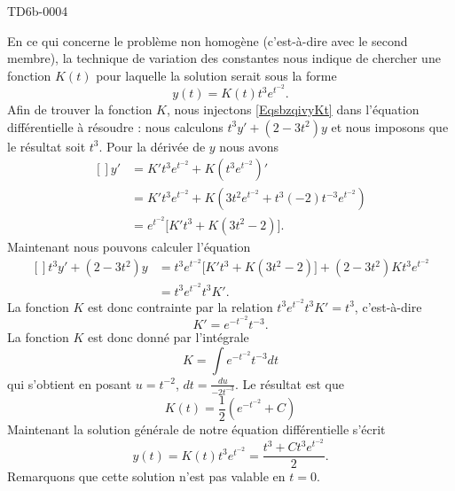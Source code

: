 \begin{corrige}{TD6b-0004}
\begin{enumerate}
			En ce qui concerne le problème non homogène (c'est-à-dire avec le second membre), la technique de variation des constantes nous indique de chercher une fonction $K(t)$ pour laquelle la solution serait sous la forme
			\begin{equation}		\label{EqsbzqivyKt}
				y(t)=K(t)t^3 e^{t^{-2}}.
			\end{equation}
			Afin de trouver la fonction $K$, nous injectons \eqref{EqsbzqivyKt} dans l'équation différentielle à résoudre : nous calculons $t^3y'+(2-3t^2)y$ et nous imposons que le résultat soit $t^3$. Pour la dérivée de $y$ nous avons
			\begin{equation}
				\begin{aligned}[]
					y'&=K't^3 e^{t^{-2}}+K\left( t^3 e^{t^{-2}} \right)'\\
					&=K't^3 e^{t^{-2}}+K\left( 3t^2e^{t^{-2}}+t^3(-2)t^{-3}e^{t^{-2}} \right)\\
					&=e^{t^{-2}}\big[ K't^3+K(3t^2-2) \big].
				\end{aligned}
			\end{equation}
			Maintenant nous pouvons calculer l'équation
			\begin{equation}
				\begin{aligned}[]
					t^3y'+(2-3t^2)y&=t^3e^{t^{-2}}\big[ K't^3+K(3t^2-2) \big]+(2-3t^2)Kt^3e^{t^{-2}}\\
					&=t^3e^{t^{-2}}t^3K'.
				\end{aligned}
			\end{equation}
			La fonction $K$ est donc contrainte par la relation $t^3e^{t^{-2}}t^3K'=t^3$, c'est-à-dire
			\begin{equation}
				K'= e^{-t^{-2}}t^{-3}.
			\end{equation}
			La fonction $K$ est donc donné par l'intégrale
			\begin{equation}
				K=\int e^{-t^{-2}}t^{-3}dt
			\end{equation}
			qui s'obtient en posant $u=t^{-2}$, $dt=\frac{ du }{ -2t^{-3} }$. Le résultat est que
			\begin{equation}
				K(t)=\frac{ 1 }{2}\left(  e^{-t^{-2}}+C \right)
			\end{equation}
			Maintenant la solution générale de notre équation différentielle s'écrit
			\begin{equation}
				y(t)=K(t)t^3 e^{t^{-2}}=\frac{ t^3+Ct^3 e^{t^{-2}} }{ 2 }.
			\end{equation}
            Remarquons que cette solution n'est pas valable en \( t=0\).
			
	\end{enumerate}

\end{corrige}
